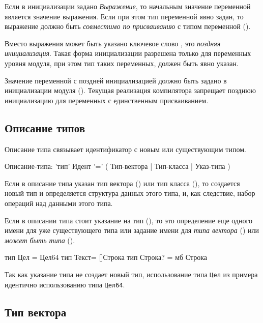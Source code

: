 Если в инициализации задано \emph{Выражение}, то начальным значение переменной является значение выражения.
Если при этом тип переменной явно задан, то выражение должно быть \emph{совместимо по присваиванию} с типом переменной ().

Вместо выражения может быть указано ключевое слово , это \emph{поздняя инициализация}. 
Такая форма инициализации разрешена только для переменных уровня модуля, при этом тип таких переменных, должен быть явно указан.

Значение переменной с поздней инициализацией должно быть задано в инициализации модуля (). 
Текущая реализация компилятора запрещает позднюю инициализацию для переменных с единственным присваиванием.

\hypertarget{types}{%
\subsection{Описание типов}\label{decls:types}}

Описание типа связывает идентификатор с новым или существующим типом.

\begin{Grammar}
Описание-типа: 
    'тип' Идент '=' 
    ( Тип-вектора 
    | Тип-класса
    | Указ-типа
    )
\end{Grammar} 

Если в описание типа указан тип вектора () или тип класса (), то создается новый тип и определяется структура данных этого типа, и, как следствие, набор операций над данными этого типа.

Если в описании типа стоит указание на тип (), 
то это определение еще одного имени для уже существующего типа 
или задание имени для \emph{типа вектора} () или \emph{может быть типа} (). 

\begin{Trivil}
тип Цел = Цел64
тип Текст= []Строка
тип Строка? = мб Строка
\end{Trivil}

Так как указание типа не создает новый тип, использование типа \verb+Цел+ из примера идентично использованию типа \verb+Цел64+.

\hypertarget{vector-types}{%
\subsection{Тип вектора}\label{decls:vector-types}}

